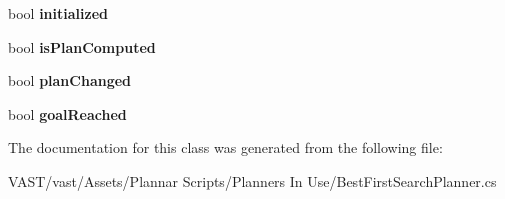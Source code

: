 \begin{DoxyCompactItemize}
\item 
\hypertarget{class_planner_ab9722eb37c59037b8ee255d129714b62}{bool {\bfseries initialized}}\label{class_planner_ab9722eb37c59037b8ee255d129714b62}

\item 
\hypertarget{class_planner_a73e7ae359b3f55578281abd81efecae1}{bool {\bfseries is\-Plan\-Computed}}\label{class_planner_a73e7ae359b3f55578281abd81efecae1}

\item 
\hypertarget{class_planner_a665a17a87d386ae4b9caa47633e06a24}{bool {\bfseries plan\-Changed}}\label{class_planner_a665a17a87d386ae4b9caa47633e06a24}

\item 
\hypertarget{class_planner_a26d738b32b82068c03b47eba1f6d8c0d}{bool {\bfseries goal\-Reached}}\label{class_planner_a26d738b32b82068c03b47eba1f6d8c0d}

\end{DoxyCompactItemize}


The documentation for this class was generated from the following file\-:\begin{DoxyCompactItemize}
\item 
V\-A\-S\-T/vast/\-Assets/\-Plannar Scripts/\-Planners In Use/Best\-First\-Search\-Planner.\-cs\end{DoxyCompactItemize}
